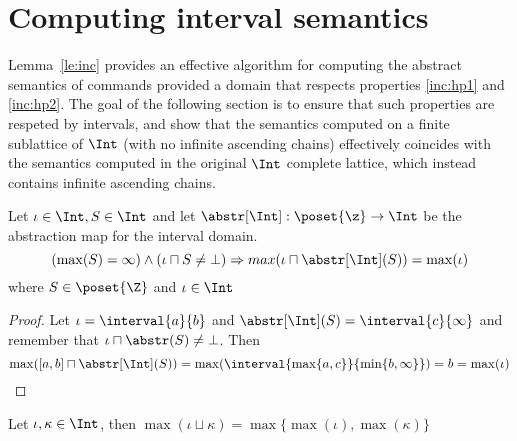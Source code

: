 \section{Computing interval semantics}
\label{sec:computingint}

Lemma~\ref{le:inc} provides an effective algorithm for computing the abstract
semantics of commands provided a domain that respects properties \ref{inc:hp1}
and \ref{inc:hp2}. The goal of the following section is to ensure that such
properties are respeted by intervals, and show that the semantics
computed on a finite sublattice of \(\Int\) (with no infinite
ascending chains) effectively coincides with the semantics computed in
the original \(\Int\) complete lattice, which instead contains
infinite ascending chains.

\begin{observation}
  Let \(\iota \in \Int, S \in \Int\) and let
  \({\abstr[\Int] : \poset{\z} \to \Int}\) be the abstraction map for
  the interval domain. 
  \begin{equation*}
    \left(\max(S) = \infty\right) \land \left(\iota \sqcap S \neq \bot\right)
    \Rightarrow max(\iota \sqcap \abstr[\Int](S)) = \max(\iota)
  \end{equation*}
  where \(S \in \poset{\Z}\) and \(\iota \in \Int\)
\end{observation}

\begin{proof}
  Let \(\iota = \interval{a}{b}\) and
  \(\abstr[\Int](S) = \interval{c}{\infty}\) and remember that
  \({\iota \sqcap \abstr(S) \neq \bot}\). Then
  \begin{equation*}
    \max([a,b] \sqcap \abstr[\Int](S)) = \max(\interval{\max\{a, c\}}{\min\{b , \infty\}}) = b = \max(\iota) \qedhere
  \end{equation*}
\end{proof}

\begin{observation}
  Let \(\iota, \kappa \in \Int\), then
  \(\max(\iota \sqcup \kappa) = \max\{\max(\iota), \max(\kappa)\}\)
\end{observation}

